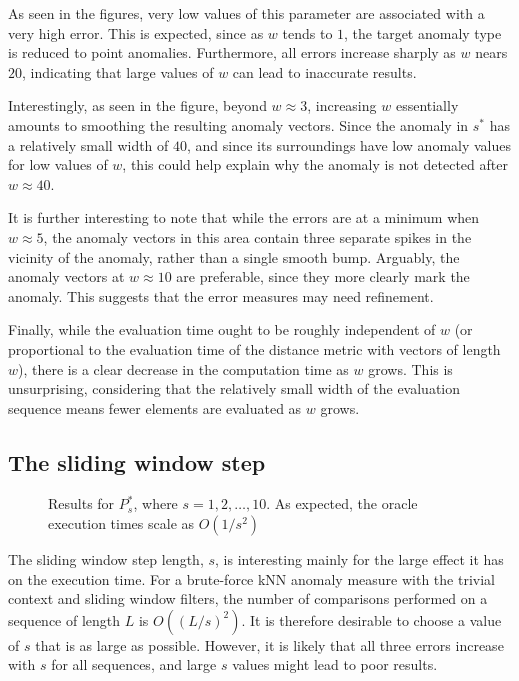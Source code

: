 As seen in the figures, very low values of this parameter are associated with a very high error. This is expected, since as $w$ tends to $1$, the target anomaly type is reduced to point anomalies. Furthermore, all errors increase sharply as $w$ nears $20$, indicating that large values of $w$ can lead to inaccurate results.

Interestingly, as seen in the figure, beyond $w \approx 3$, increasing $w$ essentially amounts to smoothing the resulting anomaly vectors. Since the anomaly in $s^*$ has a relatively small width of $40$, and since its surroundings have low anomaly values for low values of $w$, this could help explain why the anomaly is not detected after $w \approx 40$.

It is further interesting to note that while the errors are at a minimum when $w \approx 5$, the anomaly vectors in this area contain three separate spikes in the vicinity of the anomaly, rather than a single smooth bump. Arguably, the anomaly vectors at $w \approx 10$ are preferable, since they more clearly mark the anomaly. This suggests that the error measures may need refinement.

Finally, while the evaluation time ought to be roughly independent of $w$ (or proportional to the evaluation time of the distance metric with vectors of length $w$), there is a clear decrease in the computation time as $w$ grows. This is unsurprising, considering that the relatively small width of the evaluation sequence means fewer elements are evaluated as $w$ grows.

\subsection{The sliding window step}
\label{sect:s}

\begin{figure}
    \centering
    \caption{Results for $P^*_s$, where $s = 1,2,\dots,10$. As expected, the oracle execution times scale as $O(1/s^2)$}
\label{fig:s_plot}
\end{figure}

The sliding window step length, $s$, is interesting mainly for the large effect it has on the execution time. For a brute-force kNN anomaly measure with the trivial context and sliding window filters, the number of comparisons performed on a sequence of length $L$ is $O({(L/s)}^2)$. It is therefore desirable to choose a value of $s$ that is as large as possible. However, it is likely that all three errors increase with $s$ for all sequences, and large $s$ values might lead to poor results.

